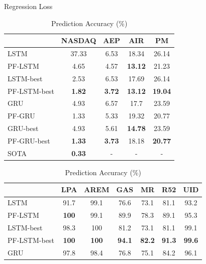 \documentclass[letterpaper]{article} %
\begin{document}
\begin{table}[!htb]
\fontsize{8}{9}\selectfont
    \parbox{.5\linewidth}{
    \caption{Regression Loss}
    \label{tab:reg}
    \centering
    \begin{tabular}{lcccc}
    \toprule
             & NASDAQ        & AEP           & AIR            & PM             \\
             \midrule
LSTM         & 37.33         & 6.53          & 18.34          & 26.14          \\
PF-LSTM      & 4.65          & 4.57          & \textbf{13.12} & 21.23          \\
LSTM-best    & 2.53          & 6.53          & 17.69          & 26.14          \\
PF-LSTM-best & \textbf{1.82} & \textbf{3.72} & \textbf{13.12} & \textbf{19.04} \\
\midrule
GRU          & 4.93          & 6.57          & 17.7           & 23.59          \\
PF-GRU       & 1.33          & 5.33          & 19.32          & 20.77          \\
GRU-best     & 4.93          & 5.61          & \textbf{14.78} & 23.59          \\
PF-GRU-best  & \textbf{1.33} & \textbf{3.73} & 18.18          & \textbf{20.77} \\
SOTA         & \textbf{0.33} & -             & -              & -  \\
\bottomrule
\end{tabular}
    }
    \parbox{.5\linewidth}{
    \caption{Prediction Accuracy (\%)}
    \label{tab:pred}
    \centering
    \begin{tabular}{lcccccc}
    \toprule
             & LPA           & AREM         & GAS           & MR            & R52           & UID           \\
             \midrule
LSTM         & 91.7          & 99.1         & 76.6          & 73.1          & 81.1          & 93.2          \\
PF-LSTM      & \textbf{100}  & 99.1         & 89.9          & 78.3          & 89.1          & 95.3          \\
LSTM-best    & 98.3          & 100          & 81.2          & 73.1          & 81.1          & 99.1          \\
PF-LSTM-best & \textbf{100}  & \textbf{100} & \textbf{94.1} & \textbf{82.2} & \textbf{91.3} & \textbf{99.6} \\
\midrule
GRU          & 97.8          & 98.4         & 76.8          & 75.1          & 84.2          & 96.1          \\

\end{tabular}}
\end{table}
\end{document}
